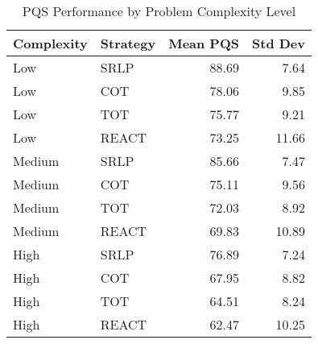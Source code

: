 \begin{table}[htbp]
\centering
\caption{PQS Performance by Problem Complexity Level}
\label{tab:pqs_by_complexity}
\begin{tabular}{llrr}
\toprule
Complexity & Strategy & Mean PQS & Std Dev \\
\midrule
Low & SRLP & 88.69 & 7.64 \\
Low & COT & 78.06 & 9.85 \\
Low & TOT & 75.77 & 9.21 \\
Low & REACT & 73.25 & 11.66 \\
Medium & SRLP & 85.66 & 7.47 \\
Medium & COT & 75.11 & 9.56 \\
Medium & TOT & 72.03 & 8.92 \\
Medium & REACT & 69.83 & 10.89 \\
High & SRLP & 76.89 & 7.24 \\
High & COT & 67.95 & 8.82 \\
High & TOT & 64.51 & 8.24 \\
High & REACT & 62.47 & 10.25 \\
\bottomrule
\end{tabular}
\end{table}